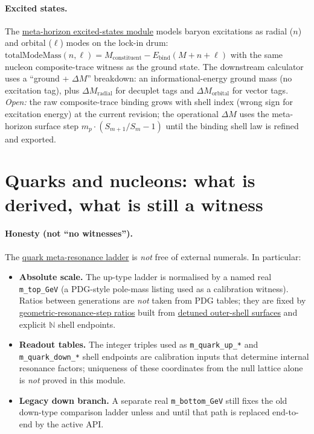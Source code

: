\documentclass[11pt]{article}
\begin{document}
\paragraph{Excited states.}
The
\hyperref[lean:meta-horizon]{meta-horizon excited-states
module} models baryon excitations as radial ($n$) and orbital
($\ell$) modes on the lock-in drum:
\(
  \mathrm{totalModeMass}(n,\ell) =
  M_{\mathrm{constituent}}-E_{\mathrm{bind}}(M+n+\ell)
\)
with the same nucleon composite-trace witness as the ground
state. The downstream calculator uses a ``ground + $\Delta M$''
breakdown: an informational-energy ground mass (no excitation
tag), plus $\Delta M_{\mathrm{radial}}$ for decuplet tags and
$\Delta M_{\mathrm{orbital}}$ for vector tags. \emph{Open:} the
raw composite-trace binding grows with shell index (wrong sign
for excitation energy) at the current revision; the operational
$\Delta M$ uses the meta-horizon surface step
$m_p\cdot(S_{m+1}/S_m-1)$ until the binding shell law is
refined and exported.

\section{Quarks and nucleons: what is derived, what is still a witness}
\label{sec:quarks}

\paragraph{Honesty (not ``no witnesses'').}
The
\hyperref[lean:quark-meta]{quark meta-resonance ladder} is
\emph{not} free of external numerals. In particular:
\begin{itemize}[leftmargin=2em]
  \item \textbf{Absolute scale.} The up-type ladder is
    normalised by a named real \texttt{m\_top\_GeV} (a
    PDG-style pole-mass listing \cite{pdg2024} used as a
    calibration witness). Ratios between generations are
    \emph{not} taken from PDG tables; they are fixed by
    \hyperref[lean:resonance-step]{geometric-resonance-step
    ratios} built from
    \hyperref[lean:detuned-shell]{detuned outer-shell
    surfaces} and explicit $\mathbb{N}$ shell endpoints.
  \item \textbf{Readout tables.} The integer triples used as
    \texttt{m\_quark\_up\_*} and \texttt{m\_quark\_down\_*}
    shell endpoints are calibration inputs that determine
    internal resonance factors; uniqueness of these
    coordinates from the null lattice alone is \emph{not}
    proved in this module.
  \item \textbf{Legacy down branch.} A separate real
    \texttt{m\_bottom\_GeV} still fixes the old down-type
    comparison ladder unless and until that path is replaced
    end-to-end by the active API.
\end{itemize}
\end{document}
